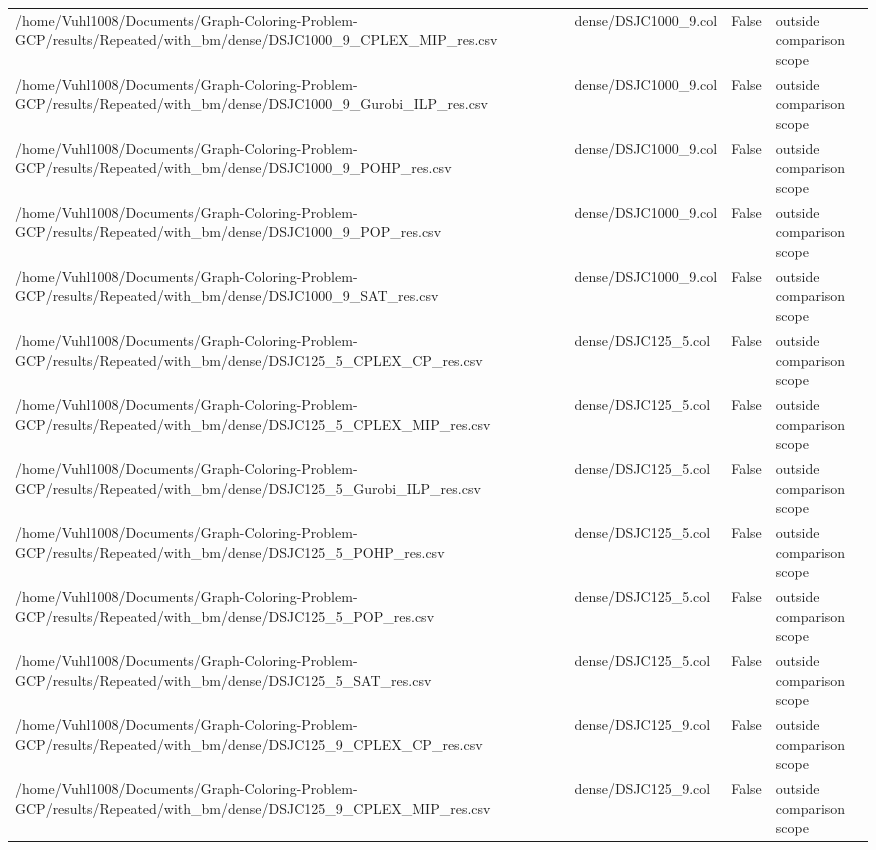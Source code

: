 \begin{table}[htbp]
\begin{tabular}{llll}
/home/Vuhl1008/Documents/Graph-Coloring-Problem-GCP/results/Repeated/with\_bm/dense/DSJC1000\_9\_CPLEX\_MIP\_res.csv & dense/DSJC1000\_9.col & False & outside comparison scope \\
/home/Vuhl1008/Documents/Graph-Coloring-Problem-GCP/results/Repeated/with\_bm/dense/DSJC1000\_9\_Gurobi\_ILP\_res.csv & dense/DSJC1000\_9.col & False & outside comparison scope \\
/home/Vuhl1008/Documents/Graph-Coloring-Problem-GCP/results/Repeated/with\_bm/dense/DSJC1000\_9\_POHP\_res.csv & dense/DSJC1000\_9.col & False & outside comparison scope \\
/home/Vuhl1008/Documents/Graph-Coloring-Problem-GCP/results/Repeated/with\_bm/dense/DSJC1000\_9\_POP\_res.csv & dense/DSJC1000\_9.col & False & outside comparison scope \\
/home/Vuhl1008/Documents/Graph-Coloring-Problem-GCP/results/Repeated/with\_bm/dense/DSJC1000\_9\_SAT\_res.csv & dense/DSJC1000\_9.col & False & outside comparison scope \\
/home/Vuhl1008/Documents/Graph-Coloring-Problem-GCP/results/Repeated/with\_bm/dense/DSJC125\_5\_CPLEX\_CP\_res.csv & dense/DSJC125\_5.col & False & outside comparison scope \\
/home/Vuhl1008/Documents/Graph-Coloring-Problem-GCP/results/Repeated/with\_bm/dense/DSJC125\_5\_CPLEX\_MIP\_res.csv & dense/DSJC125\_5.col & False & outside comparison scope \\
/home/Vuhl1008/Documents/Graph-Coloring-Problem-GCP/results/Repeated/with\_bm/dense/DSJC125\_5\_Gurobi\_ILP\_res.csv & dense/DSJC125\_5.col & False & outside comparison scope \\
/home/Vuhl1008/Documents/Graph-Coloring-Problem-GCP/results/Repeated/with\_bm/dense/DSJC125\_5\_POHP\_res.csv & dense/DSJC125\_5.col & False & outside comparison scope \\
/home/Vuhl1008/Documents/Graph-Coloring-Problem-GCP/results/Repeated/with\_bm/dense/DSJC125\_5\_POP\_res.csv & dense/DSJC125\_5.col & False & outside comparison scope \\
/home/Vuhl1008/Documents/Graph-Coloring-Problem-GCP/results/Repeated/with\_bm/dense/DSJC125\_5\_SAT\_res.csv & dense/DSJC125\_5.col & False & outside comparison scope \\
/home/Vuhl1008/Documents/Graph-Coloring-Problem-GCP/results/Repeated/with\_bm/dense/DSJC125\_9\_CPLEX\_CP\_res.csv & dense/DSJC125\_9.col & False & outside comparison scope \\
/home/Vuhl1008/Documents/Graph-Coloring-Problem-GCP/results/Repeated/with\_bm/dense/DSJC125\_9\_CPLEX\_MIP\_res.csv & dense/DSJC125\_9.col & False & outside comparison scope \\

\end{tabular}
\end{table}
